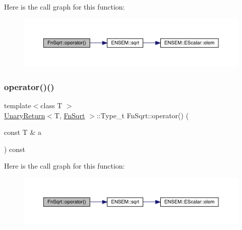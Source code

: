 Here is the call graph for this function\+:
\nopagebreak
\begin{figure}[H]
\begin{center}
\leavevmode
\includegraphics[width=350pt]{d0/d4d/structFnSqrt_a019bed3e40dc318937e7655b3e4222bb_cgraph}
\end{center}
\end{figure}
\mbox{\label{structFnSqrt_a019bed3e40dc318937e7655b3e4222bb}} 
\subsubsection{\texorpdfstring{operator()()}{operator()()}\hspace{0.1cm}{\footnotesize\ttfamily [2/3]}}
{\footnotesize\ttfamily template$<$class T $>$ \\
\mbox{\hyperlink{structUnaryReturn}{Unary\+Return}}$<$T, \mbox{\hyperlink{structFnSqrt}{Fn\+Sqrt}} $>$\+::Type\+\_\+t Fn\+Sqrt\+::operator() (\begin{DoxyParamCaption}\item[{const T \&}]{a }\end{DoxyParamCaption}) const\hspace{0.3cm}{\ttfamily [inline]}}

Here is the call graph for this function\+:
\nopagebreak
\begin{figure}[H]
\begin{center}
\leavevmode
\includegraphics[width=350pt]{d0/d4d/structFnSqrt_a019bed3e40dc318937e7655b3e4222bb_cgraph}
\end{center}
\end{figure}
\mbox{\label{structFnSqrt_a019bed3e40dc318937e7655b3e4222bb}} 
